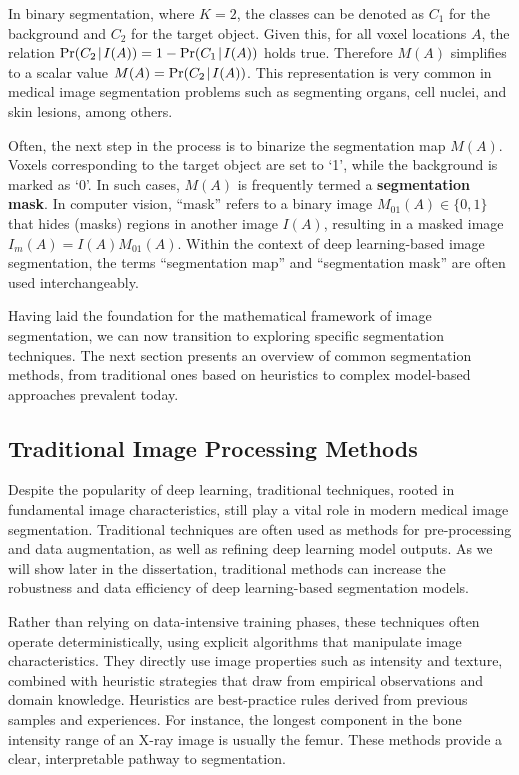 In binary segmentation, where $K=2$, the classes can be denoted as $C_1$ for the background and $C_2$ for the target object. Given this, for all voxel locations $A$, the relation $\operatorname{Pr}({C_2}\!\mid\!{I(A)}) = 1 - \operatorname{Pr}({C_1}\!\mid\!{I(A)})$ holds true. Therefore $M(A)$ simplifies to a scalar value $M(A) = \operatorname{Pr}({C_2}\!\mid\!{I(A)})$. This representation is very common in medical image segmentation problems such as segmenting organs, cell nuclei, and skin lesions, among others.

Often, the next step in the process is to binarize the segmentation map $M(A)$. Voxels corresponding to the target object are set to `1', while the background is marked as `0'. In such cases, $M(A)$ is frequently termed a \textbf{segmentation mask}. In computer vision, ``mask'' refers to a binary image $M_{01}(A) \in \{0, 1\}$ that hides (masks) regions in another image $I(A)$, resulting in a masked image $I_m(A) = I(A) M_{01}(A)$. Within the context of deep learning-based image segmentation, the terms ``segmentation map'' and ``segmentation mask'' are often used interchangeably.

Having laid the foundation for the mathematical framework of image segmentation, we can now transition to exploring specific segmentation techniques. The next section presents an overview of common segmentation methods, from traditional ones based on heuristics to complex model-based approaches prevalent today.

\subsection{Traditional Image Processing Methods}

Despite the popularity of deep learning, traditional techniques, rooted in fundamental image characteristics, still play a vital role in modern medical image segmentation. Traditional techniques are often used as methods for pre-processing and data augmentation, as well as refining deep learning model outputs. As we will show later in the dissertation, traditional methods can increase the robustness and data efficiency of deep learning-based segmentation models.

Rather than relying on data-intensive training phases, these techniques often operate deterministically, using explicit algorithms that manipulate image characteristics. They directly use image properties such as intensity and texture, combined with heuristic strategies that draw from empirical observations and domain knowledge. Heuristics are best-practice rules derived from previous samples and experiences. For instance, the longest component in the bone intensity range of an X-ray image is usually the femur. These methods provide a clear, interpretable pathway to segmentation.

